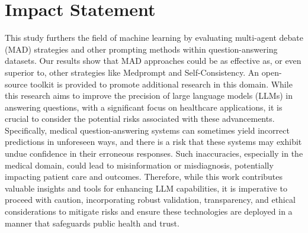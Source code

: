 \documentclass{article}  %
\begin{document}


\section*{Impact Statement} \label{sec:impact_statement}
This study furthers the field of machine learning by evaluating multi-agent debate (MAD) strategies and other prompting methods within question-answering datasets. Our results show that MAD approaches could be as effective as, or even superior to, other strategies like Medprompt and Self-Consistency. An open-source toolkit is provided to promote additional research in this domain. While this research aims to improve the precision of large language models (LLMs) in answering questions, with a significant focus on healthcare applications, it is crucial to consider the potential risks associated with these advancements. Specifically, medical question-answering systems can sometimes yield incorrect predictions in unforeseen ways, and there is a risk that these systems may exhibit undue confidence in their erroneous responses. Such inaccuracies, especially in the medical domain, could lead to misinformation or misdiagnosis, potentially impacting patient care and outcomes. Therefore, while this work contributes valuable insights and tools for enhancing LLM capabilities, it is imperative to proceed with caution, incorporating robust validation, transparency, and ethical considerations to mitigate risks and ensure these technologies are deployed in a manner that safeguards public health and trust.

\small

% 



\newpage
\appendix
\onecolumn

\end{document}
